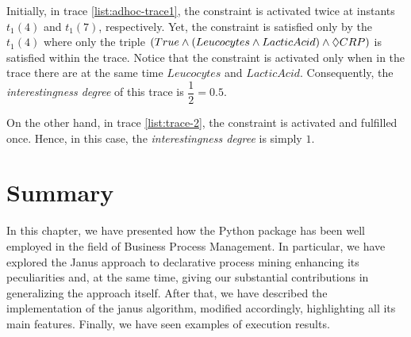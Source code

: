 \begin{example}
Initially, in trace \ref{list:adhoc-trace1}, the constraint is activated twice at instants $t_1(4)$ and $t_1(7)$, respectively. Yet, the constraint is satisfied only by the $t_1(4)$ where only the triple $(True \wedge (Leucocytes \wedge LacticAcid) \wedge \Diamond CRP)$ is satisfied within the trace. Notice that the constraint is activated only when in the trace there are at the same time $Leucocytes$ and $LacticAcid$. Consequently, the \textit{interestingness degree} of this trace is $\dfrac{1}{2} = 0.5$.

On the other hand, in trace \ref{list:trace-2}, the constraint is activated and fulfilled once. Hence, in this case, the \textit{interestingness degree} is simply $1$.
\end{example}

\section{Summary}
In this chapter, we have presented how the \LTLfToDFA Python package has been well employed in the field of Business Process Management. In particular, we have explored the Janus approach to declarative process mining enhancing its peculiarities and, at the same time, giving our substantial contributions in generalizing the approach itself. After that, we have described the implementation of the janus algorithm, modified accordingly, highlighting all its main features. Finally, we have seen examples of execution results.
















